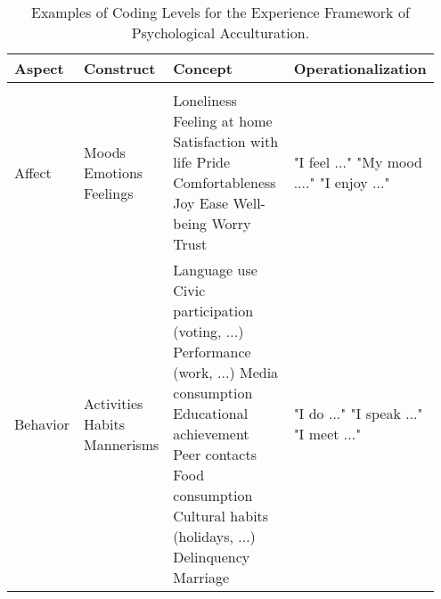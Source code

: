 \begin{table}%
\caption{Examples of Coding Levels for the Experience Framework of Psychological Acculturation.}
\label{tab:AspectExamples} 
\begin{tabular}{>{\raggedright\arraybackslash}p{0.15\linewidth} 
>{\raggedright\arraybackslash}p{0.20\linewidth} 
>{\raggedright\arraybackslash}p{0.35\linewidth} 
>{\raggedright\arraybackslash}p{0.25\linewidth}}
\hline 
Aspect & Construct & Concept & Operationalization \\ 
\hline \\ [-0.5em]
Affect & 
Moods \linebreak Emotions \linebreak Feelings \linebreak & 
Loneliness \linebreak Feeling at home \linebreak Satisfaction with life \linebreak Pride \linebreak Comfortableness \linebreak Joy \linebreak Ease \linebreak Well-being \linebreak Worry \linebreak Trust \linebreak & 
"I feel ..." \linebreak "My mood ...." \linebreak "I enjoy ..." \linebreak \\

Behavior & 
Activities \linebreak Habits \linebreak Mannerisms \linebreak & 
Language use \linebreak Civic participation (voting, ...) \linebreak Performance (work, ...) \linebreak Media consumption \linebreak Educational achievement \linebreak Peer contacts \linebreak Food consumption \linebreak Cultural habits (holidays, ...) \linebreak Delinquency \linebreak Marriage \linebreak & 
"I do ..." \linebreak "I speak ..." \linebreak "I meet ..." \linebreak \\ 


\end{tabular}
\end{table}
